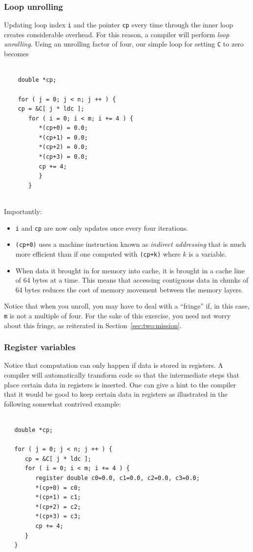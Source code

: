 \subsubsection{Loop unrolling}

Updating loop index {\tt i} and the pointer {\tt cp} every time through the inner loop creates considerable overhead.  For this reason, a compiler will perform {\em loop unrolling}.  Using an unrolling factor of four, our simple loop for setting {\tt C} to zero becomes
 \begin{verbatim}
 
    double *cp;
 
    for ( j = 0; j < n; j ++ ) {
    cp = &C[ j * ldc ];           
       for ( i = 0; i < m; i += 4 ) {                
          *(cp+0) = 0.0; 
          *(cp+1) = 0.0; 
          *(cp+2) = 0.0; 
          *(cp+3) = 0.0;
          cp += 4;                
          }                                           
       }  
              
 \end{verbatim}
Importantly:
\begin{itemize}
	\item {\tt i} and {\tt cp} are now only updates once every four iterations.
	\item {\tt *(cp+0)} uses a machine instruction known as {\em indirect addressing} that is much more efficient than if one computed with {\tt *(cp+k)} where $ k $ is a variable.  
	\item
	When data it brought in for memory into cache, it is brought in a cache line of 64 bytes at a time.  This means that accessing contiguous data in chunks of 64 bytes reduces the cost of memory movement between the memory layers.
\end{itemize}
Notice that when you unroll, you may have to deal with a ``fringe'' if, in this case, {\tt m} is not a multiple of four.    For the sake of this exercise, you need not worry about this fringe, as reiterated in Section~\ref{sec:two:mission}.

\subsubsection{Register variables}

Notice that computation can only happen if data is stored in registers.  A compiler will automatically transform code so that the intermediate steps that place certain data in registers is inserted.  One can give a hint to the compiler that it would be good to keep certain data in registers as illustrated in the following somewhat contrived example:
\begin{verbatim}

   double *cp;

   for ( j = 0; j < n; j ++ ) {
      cp = &C[ j * ldc ];           
      for ( i = 0; i < m; i += 4 ) {
         register double c0=0.0, c1=0.0, c2=0.0, c3=0.0;                
         *(cp+0) = c0; 
         *(cp+1) = c1; 
         *(cp+2) = c2; 
         *(cp+3) = c3;
         cp += 4;                
      }                                           
   }       
\end{verbatim}

